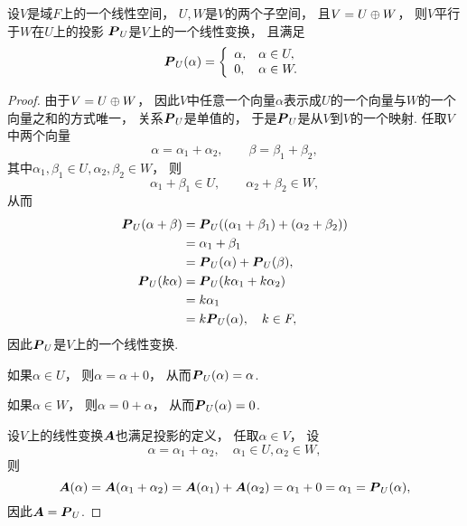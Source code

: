 \begin{theorem}\label{theorem:线性映射.投影是线性变换}
设\(V\)是域\(F\)上的一个线性空间，
\(U,W\)是\(V\)的两个子空间，
且\(V=U \oplus W\)，
则\(V\)平行于\(W\)在\(U\)上的投影
\(\boldsymbol{P}_U\)是\(V\)上的一个线性变换，
且满足\begin{equation*}
	\boldsymbol{P}_U(\alpha)
	=\left\{ \begin{array}{ll}
		\alpha, & \alpha\in U, \\
		0, & \alpha\in W.
	\end{array} \right.
\end{equation*}
\begin{proof}
由于\(V = U \oplus W\)，
因此\(V\)中任意一个向量\(\alpha\)表示成\(U\)的一个向量与\(W\)的一个向量之和的方式唯一，
关系\(\boldsymbol{P}_U\)是单值的，
于是\(\boldsymbol{P}_U\)是从\(V\)到\(V\)的一个映射.
任取\(V\)中两个向量\begin{equation*}
	\alpha = \alpha_1 + \alpha_2,
	\qquad
	\beta = \beta_1 + \beta_2,
\end{equation*}
其中\(\alpha_1,\beta_1 \in U,
\alpha_2,\beta_2 \in W\)，
则\begin{equation*}
	\alpha_1 + \beta_1
	\in U,
	\qquad
	\alpha_2 + \beta_2
	\in W,
\end{equation*}
从而\begin{align*}
	\boldsymbol{P}_U(\alpha + \beta)
	&= \boldsymbol{P}_U((\alpha_1 + \beta_1) + (\alpha_2 + \beta_2)) \\
	&= \alpha_1 + \beta_1 \\
	&= \boldsymbol{P}_U(\alpha) + \boldsymbol{P}_U(\beta), \\
	\boldsymbol{P}_U(k \alpha)
	&= \boldsymbol{P}_U(k \alpha_1 + k \alpha_2) \\
	&= k \alpha_1 \\
	&= k \boldsymbol{P}_U(\alpha),
	\quad k \in F,
\end{align*}
因此\(\boldsymbol{P}_U\)是\(V\)上的一个线性变换.

如果\(\alpha \in U\)，
则\(\alpha = \alpha + 0\)，
从而\(\boldsymbol{P}_U(\alpha) = \alpha\).

如果\(\alpha \in W\)，
则\(\alpha = 0 + \alpha\)，
从而\(\boldsymbol{P}_U(\alpha) = 0\).

设\(V\)上的线性变换\(\boldsymbol{A}\)也满足投影的定义，
任取\(\alpha \in V\)，
设\begin{equation*}
	\alpha = \alpha_1 + \alpha_2,
	\quad
	\alpha_1 \in U,
	\alpha_2 \in W,
\end{equation*}
则\begin{equation*}
	\boldsymbol{A}(\alpha)
	= \boldsymbol{A}(\alpha_1 + \alpha_2)
	= \boldsymbol{A}(\alpha_1) + \boldsymbol{A}(\alpha_2)
	= \alpha_1 + 0
	= \alpha_1
	= \boldsymbol{P}_U(\alpha),
\end{equation*}
因此\(\boldsymbol{A} = \boldsymbol{P}_U\).
\end{proof}
\end{theorem}

